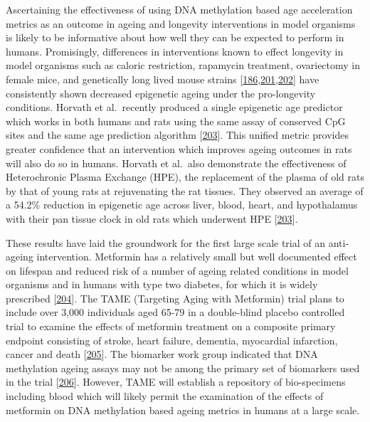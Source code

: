 \documentclass[
]{book}
\begin{document}
Ascertaining the effectiveness of using DNA methylation based age acceleration metrics as an outcome in ageing and longevity interventions in model organisms is likely to be informative about how well they can be expected to perform in humans.
Promisingly, differences in interventions known to effect longevity in model organisms such as caloric restriction, rapamycin treatment, ovariectomy in female mice, and genetically long lived mouse strains {[}\protect\hyperlink{ref-Stubbs2017}{186},\protect\hyperlink{ref-Gensous2019}{201},\protect\hyperlink{ref-Wang2017a}{202}{]} have consistently shown decreased epigenetic ageing under the pro-longevity conditions.
Horvath et al.~recently produced a single epigenetic age predictor which works in both humans and rats using the same assay of conserved CpG sites and the same age prediction algorithm {[}\protect\hyperlink{ref-Horvath2020}{203}{]}.
This unified metric provides greater confidence that an intervention which improves ageing outcomes in rats will also do so in humans.
Horvath et al.~also demonstrate the effectiveness of Heterochronic Plasma Exchange (HPE), the replacement of the plasma of old rats by that of young rats at rejuvenating the rat tissues.
They observed an average of a 54.2\% reduction in epigenetic age across liver, blood, heart, and hypothalamus with their pan tissue clock in old rats which underwent HPE {[}\protect\hyperlink{ref-Horvath2020}{203}{]}.

These results have laid the groundwork for the first large scale trial of an anti-ageing intervention.
Metformin has a relatively small but well documented effect on lifespan and reduced risk of a number of ageing related conditions in model organisms and in humans with type two diabetes, for which it is widely prescribed {[}\protect\hyperlink{ref-Kulkarni2020}{204}{]}.
The TAME (Targeting Aging with Metformin) trial plans to include over 3,000 individuals aged 65-79 in a double-blind placebo controlled trial to examine the effects of metformin treatment on a composite primary endpoint consisting of stroke, heart failure, dementia, myocardial infarction, cancer and death {[}\protect\hyperlink{ref-TAME2020}{205}{]}.
The biomarker work group indicated that DNA methylation ageing assays may not be among the primary set of biomarkers used in the trial {[}\protect\hyperlink{ref-Justice2018}{206}{]}.
However, TAME will establish a repository of bio-specimens including blood which will likely permit the examination of the effects of metformin on DNA methylation based ageing metrics in humans at a large scale.
\end{document}
